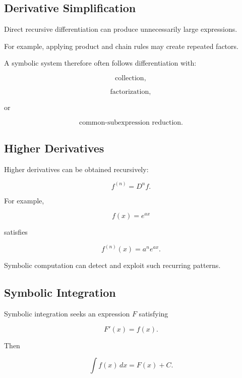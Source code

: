 \subsection{Derivative Simplification}
\label{subsec:derivative-simplification}

Direct recursive differentiation can produce unnecessarily large
expressions.

For example, applying product and chain rules may create repeated factors.

A symbolic system therefore often follows differentiation with:

\[
\boxed{
\text{collection},
}
\]

\[
\boxed{
\text{factorization},
}
\]

or

\[
\boxed{
\text{common-subexpression reduction}.
}
\]

\subsection{Higher Derivatives}
\label{subsec:symbolic-higher-derivatives}

Higher derivatives can be obtained recursively:

\[
\boxed{
f^{(n)}
=
D^nf.
}
\]

For example,

\[
f(x)=e^{ax}
\]

satisfies

\[
\boxed{
f^{(n)}(x)
=
a^ne^{ax}.
}
\]

Symbolic computation can detect and exploit such recurring patterns.

\subsection{Symbolic Integration}
\label{subsec:symbolic-integration}

Symbolic integration seeks an expression \(F\) satisfying

\[
\boxed{
F'(x)=f(x).
}
\]

Then

\[
\boxed{
\int f(x)\,dx
=
F(x)+C.
}
\]

